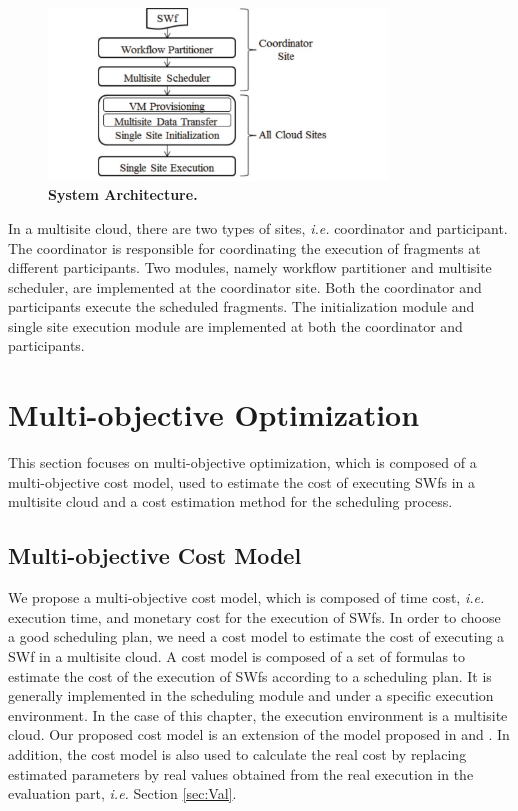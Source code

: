 \begin{figure}[htbp]
\begin{centering}
\captionsetup{justification=centering}
\includegraphics[width=90mm]{figures/FIG1}
\par\end{centering}
\caption{\textbf{System Architecture. }}
\label{fig:SM}
\end{figure}

In a multisite cloud, there are two types of sites, \textit{i.e.} coordinator and participant. The coordinator is responsible for coordinating the execution of fragments at different participants. Two modules, namely workflow partitioner and multisite scheduler, are implemented at the coordinator site. Both the coordinator and participants execute the scheduled fragments. The initialization module and single site execution module are implemented at both the coordinator and participants.

\section{Multi-objective Optimization}
\label{sec:MoO}
This section focuses on multi-objective optimization, which is composed of a multi-objective cost model, used to estimate the cost of executing SWfs in a multisite cloud and a cost estimation method for the scheduling process. 

\subsection{Multi-objective Cost Model}
\label{subsec:MoCM}

We propose a multi-objective cost model, which is composed of time cost, \textit{i.e.} execution time, and monetary cost for the execution of SWfs. In order to choose a good scheduling plan, we need a cost model to estimate the cost of executing a SWf in a multisite cloud. A cost model is composed of a set of formulas to estimate the cost of the execution of SWfs \cite{Oliveira2012} according to a scheduling plan. It is generally implemented in the scheduling module and under a specific execution environment. In the case of this chapter, the execution environment is a multisite cloud. Our proposed cost model is an extension of the model proposed in \cite{Oliveira2012} and \cite{Sardina2010}. In addition, the cost model is also used to calculate the real cost by replacing estimated parameters by real values obtained from the real execution in the evaluation part, \textit{i.e.} Section \ref{sec:Val}.

